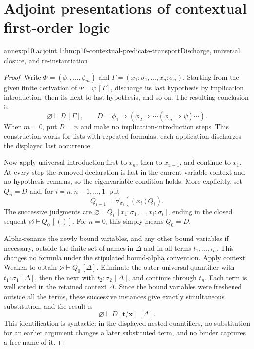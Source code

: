 
\section{Adjoint presentations of contextual first-order logic}

\begin{annexitem}{annex:p10.adjoint.1}{thm:p10-contextual-predicate-transport}{Discharge, universal closure, and re-instantiation}
\begin{proof}
Write \(\Phi=(\phi_1,\ldots,\phi_m)\) and
\(\Gamma=(x_1:\sigma_1,\ldots,x_n:\sigma_n)\).
Starting from the given finite derivation of
\(\Phi\vdash\psi\,[\Gamma]\), discharge its last hypothesis
by implication introduction, then its next-to-last hypothesis,
and so on. The resulting conclusion is
\[
 \varnothing\vdash D\,[\Gamma],\qquad
 D=\phi_1\Rightarrow
       (\phi_2\Rightarrow\cdots(\phi_m\Rightarrow\psi)\cdots).
\]
When \(m=0\), put \(D=\psi\) and make no implication-introduction
steps. This construction works for lists with repeated formulas:
each application discharges the displayed last occurrence.

Now apply universal introduction first to \(x_n\), then to
\(x_{n-1}\), and continue to \(x_1\).
At every step the removed declaration is last in the current
variable context and no hypothesis remains, so the eigenvariable
condition holds. More explicitly, set \(Q_n=D\) and, for
\(i=n,n-1,\ldots,1\), put
\[
                         Q_{i-1}=\forall_{\sigma_i}((x_i)Q_i).
\]
The successive judgments are
\(\varnothing\vdash Q_i\,[x_1:\sigma_1,\ldots,x_i:\sigma_i]\),
ending in the closed sequent
\(\varnothing\vdash Q_0\,[()]\).
For \(n=0\), this simply means \(Q_0=D\).

Alpha-rename the newly bound variables, and any other bound
variables if necessary, outside the finite set of names in
\(\Delta\) and in all terms \(t_1,\ldots,t_n\).
This changes no formula under the stipulated bound-alpha convention.
Apply context Weaken to obtain
\(\varnothing\vdash Q_0\,[\Delta]\).
Eliminate the outer universal quantifier with
\(t_1:\sigma_1\,[\Delta]\), then the next with
\(t_2:\sigma_2\,[\Delta]\), and continue through \(t_n\).
Each term is well sorted in the retained context \(\Delta\).
Since the bound variables were freshened outside all the terms,
these successive instances give exactly simultaneous substitution,
and the result is
\[
             \varnothing\vdash D[\mathbf t/\mathbf x]\,[\Delta].
\]
This identification is syntactic: in the displayed nested
quantifiers, no substitution for an earlier argument changes a
later substituted term, and no binder captures a free name of it.


\end{proof}
\end{annexitem}
